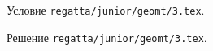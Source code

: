 Условие \texttt{regatta/junior/geomt/3.tex}.

\solution Решение \texttt{regatta/junior/geomt/3.tex}.
